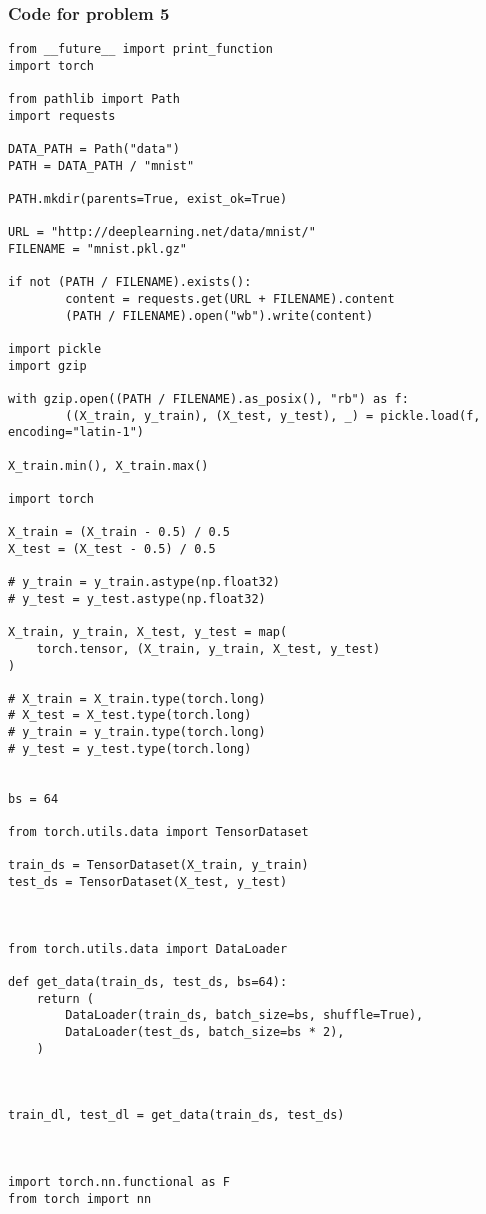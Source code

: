 \documentclass[12pt]{article}%
\begin{document}
\subsubsection*{Code for problem 5}
\begin{lstlisting}
from __future__ import print_function
import torch

from pathlib import Path
import requests

DATA_PATH = Path("data")
PATH = DATA_PATH / "mnist"

PATH.mkdir(parents=True, exist_ok=True)

URL = "http://deeplearning.net/data/mnist/"
FILENAME = "mnist.pkl.gz"

if not (PATH / FILENAME).exists():
        content = requests.get(URL + FILENAME).content
        (PATH / FILENAME).open("wb").write(content)
        
import pickle
import gzip

with gzip.open((PATH / FILENAME).as_posix(), "rb") as f:
        ((X_train, y_train), (X_test, y_test), _) = pickle.load(f, encoding="latin-1")
        
X_train.min(), X_train.max()

import torch

X_train = (X_train - 0.5) / 0.5
X_test = (X_test - 0.5) / 0.5

# y_train = y_train.astype(np.float32)
# y_test = y_test.astype(np.float32)

X_train, y_train, X_test, y_test = map(
    torch.tensor, (X_train, y_train, X_test, y_test)
)

# X_train = X_train.type(torch.long)
# X_test = X_test.type(torch.long)
# y_train = y_train.type(torch.long)
# y_test = y_test.type(torch.long)


bs = 64

from torch.utils.data import TensorDataset

train_ds = TensorDataset(X_train, y_train)
test_ds = TensorDataset(X_test, y_test)



from torch.utils.data import DataLoader

def get_data(train_ds, test_ds, bs=64):
    return (
        DataLoader(train_ds, batch_size=bs, shuffle=True),
        DataLoader(test_ds, batch_size=bs * 2),
    )



train_dl, test_dl = get_data(train_ds, test_ds)



import torch.nn.functional as F
from torch import nn


\end{lstlisting}
\end{document}
